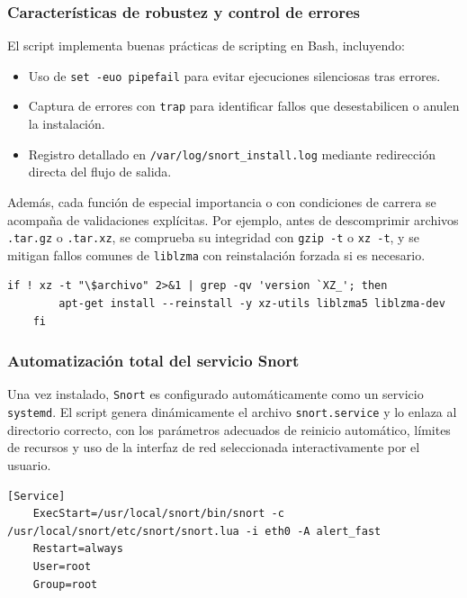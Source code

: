 \documentclass[11pt,a4paper,twoside]{report}
\begin{document}
\subsubsection{Características de robustez y control de errores}

El script implementa buenas prácticas de scripting en Bash, incluyendo:

\begin{itemize}
	\item Uso de \texttt{set -euo pipefail} para evitar ejecuciones silenciosas tras errores.
	\item Captura de errores con \texttt{trap} para identificar fallos que desestabilicen o anulen la instalación.
	\item Registro detallado en \texttt{/var/log/snort\_install.log} mediante redirección directa del flujo de salida.
\end{itemize}

Además, cada función de especial importancia o con condiciones de carrera se acompaña de validaciones explícitas. Por ejemplo, antes de descomprimir archivos \texttt{.tar.gz} o \texttt{.tar.xz}, se comprueba su integridad con \texttt{gzip -t} o \texttt{xz -t}, y se mitigan fallos comunes de \texttt{liblzma} con reinstalación forzada si es necesario.

\begin{lstlisting}[style=commandstyle, caption={Validación e instalación segura de paquetes xz}, label="lst:xz"]
	if ! xz -t "\$archivo" 2>&1 | grep -qv 'version `XZ_'; then
		apt-get install --reinstall -y xz-utils liblzma5 liblzma-dev
	fi
\end{lstlisting}

\subsubsection{Automatización total del servicio Snort}

Una vez instalado, \texttt{Snort} es configurado automáticamente como un servicio \texttt{systemd}. El script genera dinámicamente el archivo \texttt{snort.service} y lo enlaza al directorio correcto, con los parámetros adecuados de reinicio automático, límites de recursos y uso de la interfaz de red seleccionada interactivamente por el usuario.

\begin{lstlisting}[style=commandstyle, caption={Sección relevante del systemd generado}, label=lst:systemd]
	[Service]
	ExecStart=/usr/local/snort/bin/snort -c /usr/local/snort/etc/snort/snort.lua -i eth0 -A alert_fast
	Restart=always
	User=root
	Group=root
\end{lstlisting}
\end{document}
